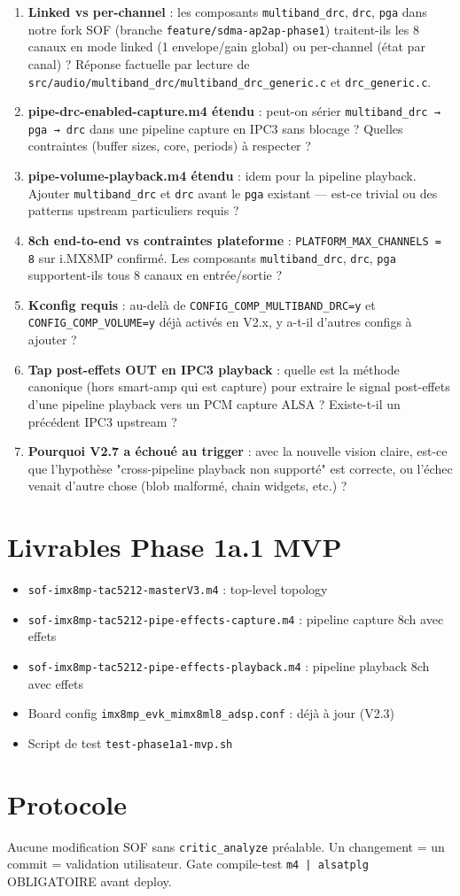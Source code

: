 \documentclass[11pt,a4paper]{article}
\begin{document}
\begin{enumerate}[leftmargin=*, itemsep=2pt]
  \item \textbf{Linked vs per-channel} : les composants \texttt{multiband\_drc}, \texttt{drc}, \texttt{pga} dans notre fork SOF (branche \texttt{feature/sdma-ap2ap-phase1}) traitent-ils les 8 canaux en mode linked (1 envelope/gain global) ou per-channel (état par canal) ? Réponse factuelle par lecture de \texttt{src/audio/multiband\_drc/multiband\_drc\_generic.c} et \texttt{drc\_generic.c}.
  \item \textbf{pipe-drc-enabled-capture.m4 étendu} : peut-on sérier \texttt{multiband\_drc → pga → drc} dans une pipeline capture en IPC3 sans blocage ? Quelles contraintes (buffer sizes, core, periods) à respecter ?
  \item \textbf{pipe-volume-playback.m4 étendu} : idem pour la pipeline playback. Ajouter \texttt{multiband\_drc} et \texttt{drc} avant le \texttt{pga} existant — est-ce trivial ou des patterns upstream particuliers requis ?
  \item \textbf{8ch end-to-end vs contraintes plateforme} : \texttt{PLATFORM\_MAX\_CHANNELS = 8} sur i.MX8MP confirmé. Les composants \texttt{multiband\_drc}, \texttt{drc}, \texttt{pga} supportent-ils tous 8 canaux en entrée/sortie ?
  \item \textbf{Kconfig requis} : au-delà de \texttt{CONFIG\_COMP\_MULTIBAND\_DRC=y} et \texttt{CONFIG\_COMP\_VOLUME=y} déjà activés en V2.x, y a-t-il d'autres configs à ajouter ?
  \item \textbf{Tap post-effets OUT en IPC3 playback} : quelle est la méthode canonique (hors smart-amp qui est capture) pour extraire le signal post-effets d'une pipeline playback vers un PCM capture ALSA ? Existe-t-il un précédent IPC3 upstream ?
  \item \textbf{Pourquoi V2.7 a échoué au trigger} : avec la nouvelle vision claire, est-ce que l'hypothèse "cross-pipeline playback non supporté" est correcte, ou l'échec venait d'autre chose (blob malformé, chain widgets, etc.) ?
\end{enumerate}

\section{Livrables Phase 1a.1 MVP}

\begin{itemize}[leftmargin=*, itemsep=1pt]
  \item \texttt{sof-imx8mp-tac5212-masterV3.m4} : top-level topology
  \item \texttt{sof-imx8mp-tac5212-pipe-effects-capture.m4} : pipeline capture 8ch avec effets
  \item \texttt{sof-imx8mp-tac5212-pipe-effects-playback.m4} : pipeline playback 8ch avec effets
  \item Board config \texttt{imx8mp\_evk\_mimx8ml8\_adsp.conf} : déjà à jour (V2.3)
  \item Script de test \texttt{test-phase1a1-mvp.sh}
\end{itemize}

\section{Protocole}

Aucune modification SOF sans \texttt{critic\_analyze} préalable. Un changement = un commit = validation utilisateur. Gate compile-test \texttt{m4 | alsatplg} OBLIGATOIRE avant deploy.
\end{document}
